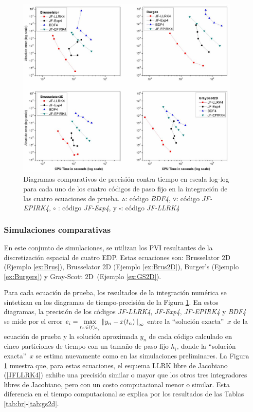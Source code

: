 \begin{figure}[htb]
	\centering
	\includegraphics[width=1\textwidth]{Graphics/lldp-fj/Diagram_new.jpg}
	\caption{Diagramas comparativos de precisión contra tiempo en escala log-log para cada uno de los cuatro códigos de paso fijo en la integración de las cuatro ecuaciones de prueba. $\vartriangle$: código \emph{BDF4}, $\triangledown$: código \emph{JF-EPIRK4},  $\circ$ : código \emph{JF-Exp4}, y $\square$: código \emph{JF-LLRK4}} \label{work-precision diagram}
\end{figure}


\subsubsection{Simulaciones comparativas}\label{sc:comparison}

En este conjunto de simulaciones, se utilizan los PVI resultantes de la discretización espacial de cuatro EDP. Estas ecuaciones son: Brusselator 2D (Ejemplo \ref{ex:Brus}), Brusselator 2D (Ejemplo \ref{ex:Brus2D}), Burger's (Ejemplo \ref{ex:Burgers}) y Gray-Scott 2D~(Ejemplo \ref{ex:GS2D}).

Para cada ecuación de prueba, los resultados de la integración numérica se sintetizan en los diagramas de tiempo-precisión de la Figura \ref{work-precision diagram}. En estos diagramas, la precisión de los códigos \textit{JF-LLRK4}, \textit{JF-Exp4}, \textit{JF-EPIRK4} y \textit{BDF4} se mide por el error $e_i=\max\limits_ {t_n\in(t)_{h_i}}\left\lVert y_n-x(t_n) \right\rVert_\infty$ entre la \textquotedblleft solución exacta\textquotedblright~$x$ de la ecuación de prueba y la solución aproximada $y_n$ de cada código calculado en cinco particiones de tiempo con un tamaño de paso fijo $h_i$, donde la \textquotedblleft solución exacta\textquotedblright ~$x $ se estima nuevamente como en las simulaciones preliminares. La Figura \ref{work-precision diagram} muestra que, para estas ecuaciones, el esquema LLRK libre de Jacobiano (\ref{JFLLRK4}) exhibe una precisión similar o mayor que los otros tres integradores libres de Jacobiano, pero con un costo computacional menor o similar. Esta diferencia en el tiempo computacional se explica por los resultados de las Tablas \ref{tab:br}-\ref{tab:gs2d}.

